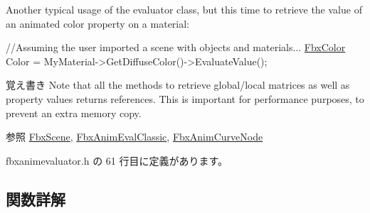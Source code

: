Another typical usage of the evaluator class, but this time to retrieve the value of an animated color property on a material\+: 
\begin{DoxyCode}
\textcolor{comment}{//Assuming the user imported a scene with objects and materials...}
\hyperlink{class_fbx_color}{FbxColor} Color = MyMaterial->GetDiffuseColor()->EvaluateValue();
\end{DoxyCode}


\begin{DoxyNote}{覚え書き}
Note that all the methods to retrieve global/local matrices as well as property values returns references. This is important for performance purposes, to prevent an extra memory copy. 
\end{DoxyNote}
\begin{DoxySeeAlso}{参照}
\hyperlink{class_fbx_scene}{Fbx\+Scene}, \hyperlink{class_fbx_anim_eval_classic}{Fbx\+Anim\+Eval\+Classic}, \hyperlink{class_fbx_anim_curve_node}{Fbx\+Anim\+Curve\+Node} 
\end{DoxySeeAlso}


 fbxanimevaluator.\+h の 61 行目に定義があります。



\subsection{関数詳解}
\mbox{\label{class_fbx_anim_evaluator_a7ffe74bd370dfef23e5c1dd88b334e3d}} 
